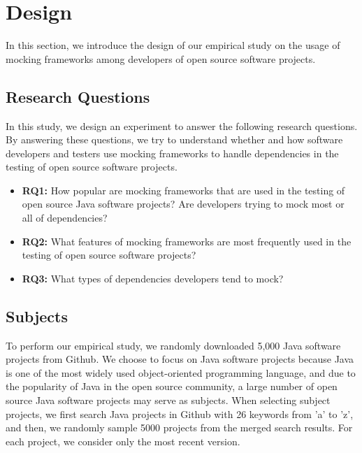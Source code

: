 \section{Design}
\label{sec:design}
In this section, we introduce the design of our empirical study on the usage of mocking frameworks among developers of open source software projects. 
\vspace{-0.2cm}

\subsection{Research Questions}
\label{subsec:rq}
\vspace{-0.2cm}

In this study, we design an experiment to answer the following research questions. By answering these questions, we try to understand whether and how software developers and testers use mocking frameworks to handle dependencies in the testing of open source software projects. 
\begin{itemize}
\item \textbf{RQ1:} How popular are mocking frameworks that are used in the testing of open source Java software projects? Are developers trying to mock most or all of dependencies?
\item \textbf{RQ2:} What features of mocking frameworks are most frequently used in the testing of open source software projects?
\item \textbf{RQ3:} What types of dependencies developers tend to mock?
\end{itemize}
\vspace{-0.2cm}

\subsection{Subjects}
\vspace{-0.2cm}

To perform our empirical study, we randomly downloaded 5,000 Java software projects from Github. We choose to focus on Java software projects because Java is one of the most widely used object-oriented programming language, and due to the popularity of Java in the open source community, a large number of open source Java software projects may serve as subjects. When selecting subject projects, we first search Java projects in Github with 26 keywords from 'a' to 'z', and then, we randomly sample 5000 projects from the merged search results. For each project, we consider only the most recent version. 

